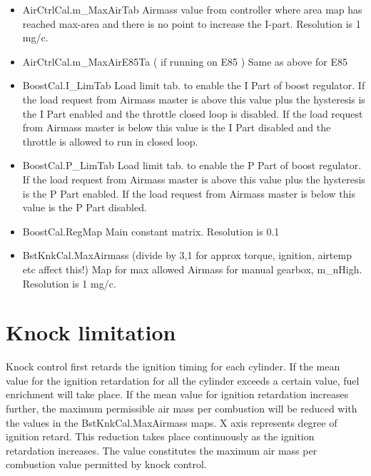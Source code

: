 \documentclass[11pt,a4paper]{book}
\begin{document}
\begin{itemize}
    \item
AirCtrlCal.m\_MaxAirTab
Airmass value from controller where area map has reached max-area and there is no point to increase
the I-part. Resolution is 1 mg/c.
    \item
AirCtrlCal.m\_MaxAirE85Ta ( if running on E85 )
Same as above for E85
    \item
BoostCal.I\_LimTab
Load limit tab. to enable the I Part of boost regulator. If the load request
from Airmass master is above this value plus the hysteresis is the I Part
enabled and the throttle closed loop is disabled. If the load request from
Airmass master is below this value is the I Part disabled and the throttle is
allowed to run in closed loop.
    \item
BoostCal.P\_LimTab
Load limit tab. to enable the P Part of boost regulator. If the load request
from Airmass master is above this value plus the hysteresis is the P Part
enabled. If the load request from Airmass master is below this value is the P
Part disabled.
    \item
BoostCal.RegMap
Main constant matrix. Resolution is 0.1 %
    \item
BstKnkCal.MaxAirmass (divide by 3,1 for approx torque, ignition, airtemp etc
affect this!) Map for max allowed Airmass for manual gearbox, m\_nHigh.
Resolution is 1 mg/c.
\end{itemize}
\section{Knock limitation}
Knock control first retards the ignition timing for each cylinder. If the mean
value for the ignition retardation for all the cylinder exceeds a certain value,
fuel enrichment will take place. If the mean value for ignition retardation
increases further, the maximum permissible air mass per combustion will be
reduced with the values in the BstKnkCal.MaxAirmass maps. X axis represents
degree of ignition retard. This reduction takes place continuously as the
ignition retardation increases. The value constitutes the maximum air mass per
combustion value permitted by knock control.
\end{document}
